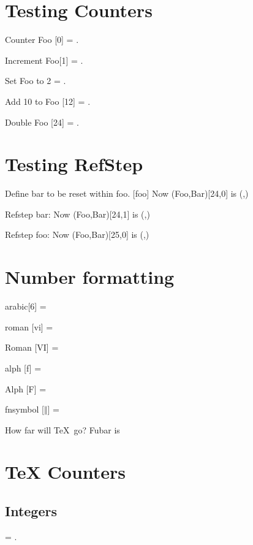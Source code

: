 \documentclass{article}
\begin{document}
\section{Testing Counters}
Counter Foo [0] = \thefoo.


Increment Foo[1] =  \thefoo.

\setcounter{foo}{2}
Set Foo to 2 = \thefoo.

\addtocounter{foo}{10}
Add 10 to Foo [12] = \thefoo.


\addtocounter{foo}{\value{foo}}
Double Foo [24] = \thefoo.

\section{Testing RefStep}
Define bar to be reset within foo.
[foo]
Now (Foo,Bar)[24,0] is (\thefoo,\thebar)

Refstep bar: 
Now (Foo,Bar)[24,1] is (\thefoo,\thebar)

Refstep foo: 
Now (Foo,Bar)[25,0] is (\thefoo,\thebar)

\section{Number formatting}
\setcounter{fubar}{6}
arabic[6] = \thefubar

\renewcommand{\thefubar}{}
roman [vi] = \thefubar


\renewcommand{\thefubar}{}
Roman [VI] = \thefubar

\renewcommand{\thefubar}{}
alph [f] = \thefubar

\renewcommand{\thefubar}{}
Alph [F] = \thefubar

\renewcommand{\thefubar}{}
fnsymbol [$\Vert$] = \thefubar

How far will \TeX\ go?
\renewcommand{\thefubar}{}
\setcounter{fubar}{9999}
Fubar is \thefubar

\section{TeX Counters}
\subsection{Integers}
\countdef{}
 = \the\two.
\end{document}
